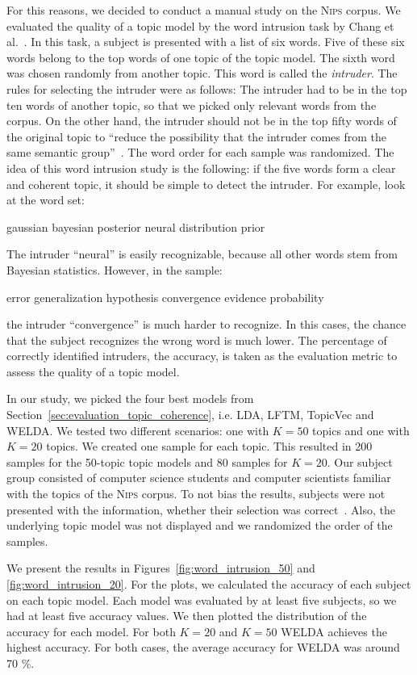\documentclass[
        a4paper,
        titlepage,
        twoside,
        parskip,
        numbers=noenddot
        ]{scrbook}
\newcommand{\topicbox}[1]{
  \setlength{\OuterFrameSep}{0pt}
  \begin{framed}
    #1
  \end{framed}
}
\theoremstyle{break}
\begin{document}
For this reasons, we decided to conduct a manual study on the \textsc{Nips} corpus.
We evaluated the quality of a topic model by the word intrusion task by Chang et al.~\cite{Chang2009}.
In this task, a subject is presented with a list of six words.
Five of these six words belong to the top words of one topic of the topic model.
The sixth word was chosen randomly from another topic.
This word is called the \emph{intruder}.
The rules for selecting the intruder were as follows:
The intruder had to be in the top ten words of another topic, so that we picked only relevant words from the corpus.
On the other hand, the intruder should not be in the top fifty words of the original topic to ``reduce the possibility that the intruder comes from the same semantic group''~\cite{Chang2009}.
The word order for each sample was randomized.
The idea of this word intrusion study is the following: if the five words form a clear and coherent topic, it should be simple to detect the intruder.
For example, look at the word set:
\topicbox{gaussian bayesian posterior neural distribution prior}
The intruder ``neural'' is easily recognizable, because all other words stem from Bayesian statistics.
However, in the sample:
\topicbox{error generalization hypothesis convergence evidence probability}
the intruder ``convergence'' is much harder to recognize.
In this cases, the chance that the subject recognizes the wrong word is much lower.
The percentage of correctly identified intruders, the accuracy, is taken as the evaluation metric to assess the quality of a topic model.

In our study, we picked the four best models from Section~\ref{sec:evaluation_topic_coherence}, i.e. LDA, LFTM, TopicVec and WELDA.
We tested two different scenarios: one with $K = 50$ topics and one with $K = 20$ topics.
We created one sample for each topic.
This resulted in 200 samples for the 50-topic topic models and 80 samples for $K = 20$.
Our subject group consisted of computer science students and computer scientists familiar with the topics of the \textsc{Nips} corpus.
To not bias the results, subjects were not presented with the information, whether their selection was correct~\cite{Chang2009}.
Also, the underlying topic model was not displayed and we randomized the order of the samples.

We present the results in Figures~\ref{fig:word_intrusion_50} and \ref{fig:word_intrusion_20}.
For the plots, we calculated the accuracy of each subject on each topic model.
Each model was evaluated by at least five subjects, so we had at least five accuracy values.
We then plotted the distribution of the accuracy for each model.
For both $K = 20$ and $K = 50$ WELDA achieves the highest accuracy.
For both cases, the average accuracy for WELDA was around 70 \%.
\end{document}
